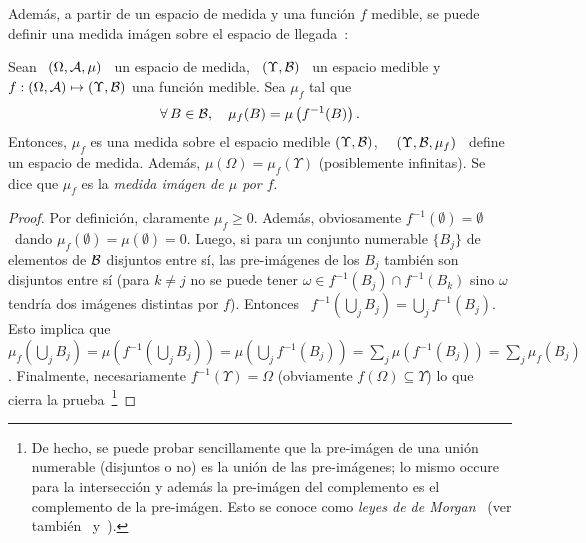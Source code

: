 Adem\'as, a partir de un espacio de medida y una funci\'on $f$ medible, se puede
definir  una  medida  im\'agen   sobre  el  espacio  de  llegada~\cite{AthLah06,
  Bog07:v1, Coh13}:
%
\begin{teorema}
\label{Teo:MP:MedidaImagen}
%
  Sean  \ $(\Omega,\mathcal{A},\mu)$  \  un espacio  de  medida, \  $(\Upsilon,\mathcal{B})$ \  un
  espacio  medible  y  $f:  (\Omega,\mathcal{A})  \mapsto  (\Upsilon,\mathcal{B})$  una  funci\'on
  medible. Sea $\mu_f$ tal que
  \[
  \forall \,  B \in  \mathcal{B}, \quad  \mu_f(B) = \mu\left( f^{-1}(B) \right).
  \]
  Entonces, $\mu_f$  es una medida  sobre el espacio medible  $(\Upsilon,\mathcal{B})$, \
  \ie  \  $(\Upsilon,\mathcal{B},\mu_f)$  \  define  un  espacio  de  medida.   Adem\'as,
  $\mu(\Omega) = \mu_f(\Upsilon)$ (posiblemente  infinitas). Se dice que $\mu_f$
  es la {\it medida im\'agen de $\mu$ por $f$}.
\end{teorema}
%
\begin{proof}
  Por   definici\'on,  claramente   $\mu_f  \ge   0$.    Adem\'as,  obviosamente
  $f^{-1}(\emptyset) =  \emptyset$ \ dando $\mu_f(\emptyset)  = \mu(\emptyset) =
  0$.  Luego,  si para un  conjunto numerable $\{  B_j \}$ de elementos  de $\mathcal{B}$
  disjuntos entre s\'i, las pre-im\'agenes  de los $B_j$ tambi\'en son disjuntos
  entre s\'i  (para $k  \ne j$ no  se puede  tener $\omega \in  f^{-1}(B_j) \cap
  f^{-1}(B_k)$  sino  $\omega$  tendr\'ia  dos im\'agenes  distintas  por  $f$).
  Entonces \ $f^{-1}\left( \bigcup_j B_j \right) = \bigcup_j f^{-1}(B_j)$.  Esto
  implica  que \  $\mu_f\left( \bigcup_j  B_j \right)  =  \mu\left( f^{-1}\left(
      \bigcup_j B_j \right) \right)  = \mu\left( \bigcup_j f^{-1}(B_j) \right) =
  \sum_j  \mu\left(  f^{-1}(B_j)  \right)  =  \sum_j  \mu_f(B_j)$.   Finalmente,
  necesariamente  $f^{-1}(\Upsilon) =  \Omega$ (obviamente  $f(\Omega) \subseteq
  \Upsilon$)  lo  que  cierra  la  prueba~\footnote{De hecho,  se  puede  probar
    sencillamente que la pre-im\'agen de  una uni\'on numerable (disjuntos o no)
    es la uni\'on de las  pre-im\'agenes; lo mismo occure para la intersecci\'on
    y  adem\'as  la  pre-im\'agen  del  complemento  es  el  complemento  de  la
    pre-im\'agen.  Esto se conoce  como {\it leyes de de Morgan}~\cite{AthLah06,
      Coh13,        HogMck13}       (ver       tambi\'en~\cite[Cap.~1]{KolFom57}
    y~\cite[Caps.~5~\&~6]{KolFom61}).\label{Foot:MP:Jacobiana}}
\end{proof}


